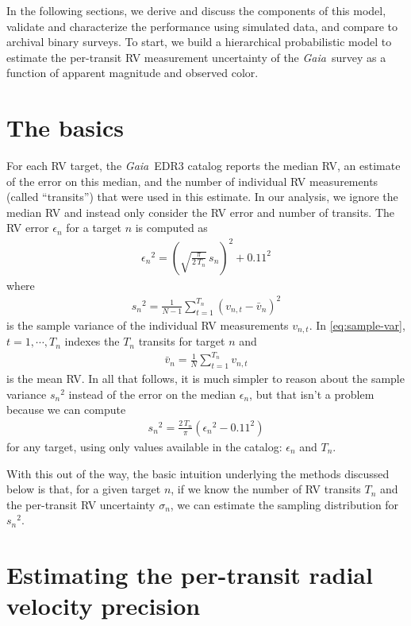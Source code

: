 \documentclass[modern, letterpaper]{aastex631}
\newcommand{\project}[1]{\textsl{#1}}
\newcommand{\Gaia}{\project{Gaia}}
\begin{document}
In the following sections, we derive and discuss the components of this model, validate and characterize the performance using simulated data, and compare to archival binary surveys.
To start, we build a hierarchical probabilistic model to estimate the per-transit RV measurement uncertainty of the \Gaia\ survey as a function of apparent magnitude and observed color.

\section{The basics}

For each RV target, the \Gaia\ EDR3 catalog reports the median RV, an estimate of the error on this median, and the number of individual RV measurements (called ``transits'') that were used in this estimate.
In our analysis, we ignore the median RV and instead only consider the RV error and number of transits.
The RV error $\epsilon_n$ for a target $n$ is computed as \citep{Katz19}
\begin{eqnarray}
	{\epsilon_n}^2 = \left(\sqrt{\frac{\pi}{2\,T_n}}\,s_n\right)^2 + 0.11^2
\end{eqnarray}
where
\begin{eqnarray}
	\label{eq:sample-var}
	{s_n}^2 = \frac{1}{N-1}\sum_{t=1}^{T_n} \left(v_{n,t} - \bar{v}_n\right)^2
\end{eqnarray}
is the sample variance of the individual RV measurements $v_{n,t}$.
In \autoref{eq:sample-var}, $t=1,\cdots,T_n$ indexes the $T_n$ transits for target $n$ and
\begin{eqnarray}
	\bar{v}_n = \frac{1}{N}\sum_{t=1}^{T_n} v_{n,t}
\end{eqnarray}
is the mean RV.
In all that follows, it is much simpler to reason about the sample variance ${s_n}^2$ instead of the error on the median ${\epsilon}_n$, but that isn't a problem because we can compute
\begin{eqnarray}
	{s_n}^2 = \frac{2\,T_n}{\pi}\left({\epsilon_n}^2 - 0.11^2\right)
\end{eqnarray}
for any target, using only values available in the catalog: $\epsilon_n$ and $T_n$.

With this out of the way, the basic intuition underlying the methods discussed below is that, for a given target $n$, if we know the number of RV transits $T_n$ and the per-transit RV uncertainty $\sigma_n$, we can estimate the sampling distribution for ${s_n}^2$.

\section{Estimating the per-transit radial velocity precision}\label{sec:noise}
\end{document}
